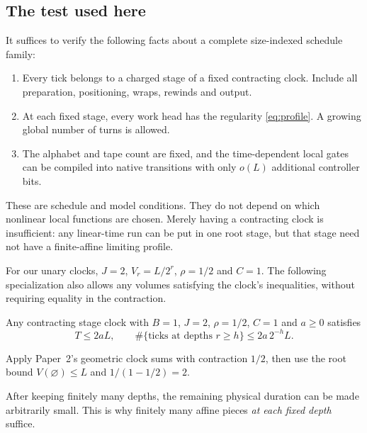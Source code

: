 \subsection{The test used here}

It suffices to verify the following facts about a complete size-indexed
schedule family:
\begin{enumerate}
\item Every tick belongs to a charged stage of a fixed contracting clock.
      Include all preparation, positioning, wraps, rewinds and output.
\item At each fixed stage, every work head has the regularity
      \eqref{eq:profile}. A growing global number of turns is allowed.
\item The alphabet and tape count are fixed, and the time-dependent local
      gates can be compiled into native transitions with only $o(L)$
      additional controller bits.
\end{enumerate}
These are schedule and model conditions. They do not depend on which
nonlinear local functions are chosen. Merely having a contracting clock
is insufficient: any linear-time run can be put in one root stage, but
that stage need not have a finite-affine limiting profile.

For our unary clocks, $J=2$, $V_r=L/2^r$, $\rho=1/2$ and $C=1$.
The following specialization also allows any volumes satisfying the clock's
inequalities, without requiring equality in the contraction.

\begin{lemma}
\label{lem:dyadic-budget}
Any contracting stage clock with $B=1$, $J=2$, $\rho=1/2$, $C=1$ and
$a\ge0$ satisfies
\begin{equation}
\label{eq:tail}
 T\le2aL,\qquad
 \#\{\text{ticks at depths }r\ge h\}\le2a\,2^{-h}L.
\end{equation}
\end{lemma}
\begin{outline}
Apply Paper~2's geometric clock sums with contraction $1/2$, then use the
root bound $V(\varnothing)\le L$ and $1/(1-1/2)=2$.
\end{outline}
After keeping finitely many depths, the remaining physical
duration can be made arbitrarily small. This is why finitely many affine
pieces \emph{at each fixed depth} suffice.
